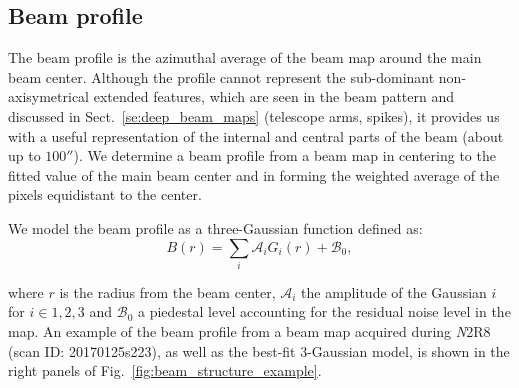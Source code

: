



\subsection{Beam profile}
\label{se:fullbeam_prof}

The beam profile is the azimuthal average of the beam map around the
main beam center. Although the profile cannot represent the sub-dominant non-axisymetrical
extended features, which are seen in the beam pattern and discussed in
Sect.~\ref{se:deep_beam_maps} (telescope arms, spikes), it provides us with a useful
representation of the internal and central parts of the beam (about up to
$100''$). We determine a beam profile from a beam map in centering to
the fitted value of the main beam center and in forming the
weighted average of the pixels equidistant to the center.

We model the beam profile as a three-Gaussian function defined as:
\begin{equation}
  B(r) = \sum_i \mathcal{A}_i G_i(r) + \mathcal{B}_0,
  \label{eq:3gauss}
\end{equation}

where $r$ is the radius from the beam center, $\mathcal{A}_i$ the
amplitude of the Gaussian $i$ for $i \in {1, 2, 3}$ and
$\mathcal{B}_0$ a piedestal level accounting for the residual noise
level in the map.
An example of the beam profile from a beam map acquired during {\emph N2R8} (scan ID:
20170125s223), as well as the best-fit 3-Gaussian model, is shown in
the right panels of Fig.~\ref{fig:beam_structure_example}.



